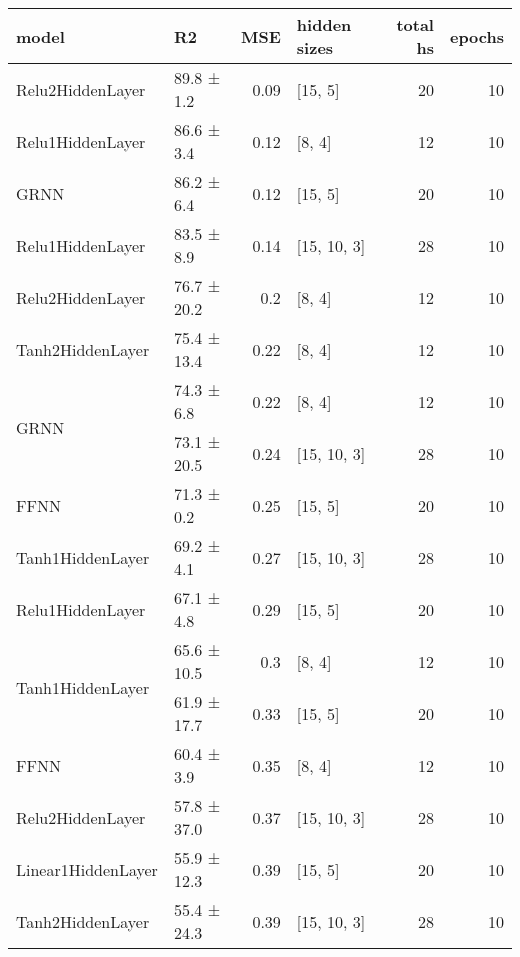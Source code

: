 
    \begin{table*}
        \centering
        \begin{tabular}{llrlrr}
\hline
 model                               & R2          &   MSE & hidden sizes   &   total hs &   epochs \\
\hline
 Relu2HiddenLayer                    & 89.8 ± 1.2  &  0.09 & [15, 5]        &         20 &       10 \\
 Relu1HiddenLayer                    & 86.6 ± 3.4  &  0.12 & [8, 4]         &         12 &       10 \\
 GRNN                                & 86.2 ± 6.4  &  0.12 & [15, 5]        &         20 &       10 \\
 Relu1HiddenLayer                    & 83.5 ± 8.9  &  0.14 & [15, 10, 3]    &         28 &       10 \\
 Relu2HiddenLayer                    & 76.7 ± 20.2 &  0.2  & [8, 4]         &         12 &       10 \\
 Tanh2HiddenLayer                    & 75.4 ± 13.4 &  0.22 & [8, 4]         &         12 &       10 \\
 \multirow{2}{*}{GRNN}               & 74.3 ± 6.8  &  0.22 & [8, 4]         &         12 &       10 \\
                                     & 73.1 ± 20.5 &  0.24 & [15, 10, 3]    &         28 &       10 \\
 FFNN                                & 71.3 ± 0.2  &  0.25 & [15, 5]        &         20 &       10 \\
 Tanh1HiddenLayer                    & 69.2 ± 4.1  &  0.27 & [15, 10, 3]    &         28 &       10 \\
 Relu1HiddenLayer                    & 67.1 ± 4.8  &  0.29 & [15, 5]        &         20 &       10 \\
 \multirow{2}{*}{Tanh1HiddenLayer}   & 65.6 ± 10.5 &  0.3  & [8, 4]         &         12 &       10 \\
                                     & 61.9 ± 17.7 &  0.33 & [15, 5]        &         20 &       10 \\
 FFNN                                & 60.4 ± 3.9  &  0.35 & [8, 4]         &         12 &       10 \\
 Relu2HiddenLayer                    & 57.8 ± 37.0 &  0.37 & [15, 10, 3]    &         28 &       10 \\
 Linear1HiddenLayer                  & 55.9 ± 12.3 &  0.39 & [15, 5]        &         20 &       10 \\
 \multirow{2}{*}{Tanh2HiddenLayer}   & 55.4 ± 24.3 &  0.39 & [15, 10, 3]    &         28 &       10 \\

\end{tabular}
\end{table*}
